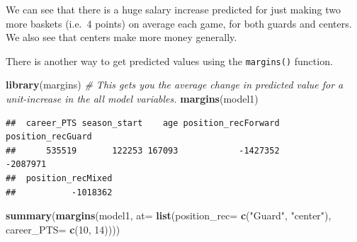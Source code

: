 \documentclass[
]{book}
\newenvironment{Shaded}{\begin{snugshade}}{\end{snugshade}}
\newcommand{\AttributeTok}[1]{\textcolor[rgb]{0.13,0.29,0.53}{#1}}
\newcommand{\CommentTok}[1]{\textcolor[rgb]{0.56,0.35,0.01}{\textit{#1}}}
\newcommand{\DecValTok}[1]{\textcolor[rgb]{0.00,0.00,0.81}{#1}}
\newcommand{\FunctionTok}[1]{\textcolor[rgb]{0.13,0.29,0.53}{\textbf{#1}}}
\newcommand{\NormalTok}[1]{#1}
\newcommand{\StringTok}[1]{\textcolor[rgb]{0.31,0.60,0.02}{#1}}
\begin{document}
We can see that there is a huge salary increase predicted for just making two more baskets (i.e.~4 points) on average each game, for both guards and centers. We also see that centers make more money generally.

There is another way to get predicted values using the \texttt{margins()} function.

\begin{Shaded}
\begin{Highlighting}[]
\FunctionTok{library}\NormalTok{(margins)}
\CommentTok{\# This gets you the average change in predicted value for a unit{-}increase in the all model variables.}
\FunctionTok{margins}\NormalTok{(model1)}
\end{Highlighting}
\end{Shaded}

\begin{verbatim}
##  career_PTS season_start    age position_recForward position_recGuard
##      535519       122253 167093            -1427352          -2087971
##  position_recMixed
##           -1018362
\end{verbatim}

\begin{Shaded}
\begin{Highlighting}[]
\FunctionTok{summary}\NormalTok{(}\FunctionTok{margins}\NormalTok{(model1, }\AttributeTok{at=} \FunctionTok{list}\NormalTok{(}\AttributeTok{position\_rec=} \FunctionTok{c}\NormalTok{(}\StringTok{"Guard"}\NormalTok{, }\StringTok{"center"}\NormalTok{),}
                         \AttributeTok{career\_PTS=} \FunctionTok{c}\NormalTok{(}\DecValTok{10}\NormalTok{, }\DecValTok{14}\NormalTok{))))}
\end{Highlighting}
\end{Shaded}
\end{document}
